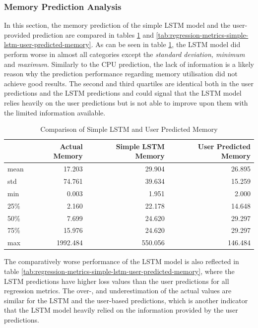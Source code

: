     \subsubsection{Memory Prediction Analysis}
    \label{sec:mem-prediction-analysis-simple-lstm-evaluation-scenarios}

      In this section, the memory prediction of the simple LSTM model and the user-provided prediction are compared in tables \ref{tab:comparison-simple-lstm-user-predicted-memory} and \ref{tab:regression-metrics-simple-lstm-user-predicted-memory}.
      As can be seen in table \ref{tab:comparison-simple-lstm-user-predicted-memory}, the LSTM model did perform worse in almost all categories except the \emph{standard deviation, minimum} and \emph{maximum}.
      Similarly to the CPU prediction, the lack of information is a likely reason why the prediction performance regarding memory utilisation did not achieve good results. The second and third quartiles are identical both in the user predictions and the LSTM predictions and could signal that the LSTM model relies heavily on the user predictions but is not able to improve upon them with the limited information available.
      \begin{table}
        \centering
        \caption{Comparison of Simple LSTM and User Predicted Memory}
        \label{tab:comparison-simple-lstm-user-predicted-memory}

        \begin{tabular}{|l|rrr|}
          \toprule
          {} &  Actual Memory &  Simple LSTM Memory &  User Predicted Memory \\
          \midrule
          mean &            17.203 &               29.904 &         26.895 \\
          std  &            74.761 &               39.634 &         15.259 \\
          min  &             0.003 &                1.951 &          2.000 \\
          25\%  &             2.160 &               22.178 &         14.648 \\
          50\%  &             7.699 &               24.620 &         29.297 \\
          75\%  &            15.976 &               24.620 &         29.297 \\
          max  &          1992.484 &              550.056 &        146.484 \\
          \bottomrule
          \end{tabular}
      \end{table}
      The comparatively worse performance of the LSTM model is also reflected in table \ref{tab:regression-metrics-simple-lstm-user-predicted-memory}, where the LSTM predictions have higher loss values than the user predictions for all regression metrics.
      The over-, and underestimation of the actual values are similar for the LSTM and the user-based predictions, which is another indicator that the LSTM model heavily relied on the information provided by the user predictions.

